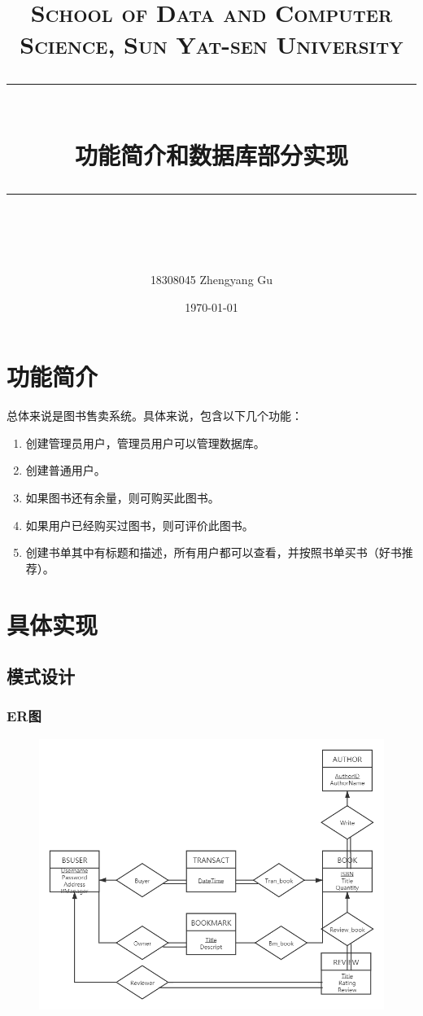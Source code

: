 \documentclass[UTF8, a4paper, 11pt]{article}
\title{	
\normalfont \normalsize
\textsc{School of Data and Computer Science, Sun Yat-sen University} \\ [25pt] %
\rule{\textwidth}{0.5pt} \\[0.4cm] %
\huge 功能简介和数据库部分实现\\ %
\rule{\textwidth}{2pt} \\[0.5cm] %
\author{18308045 Zhengyang Gu}
\date{\normalsize\today}
}
\begin{document}
\maketitle
\tableofcontents
\newpage
\section{功能简介}
总体来说是图书售卖系统。具体来说，包含以下几个功能：
\begin{enumerate}
    \item 创建管理员用户，管理员用户可以管理数据库。
    \item 创建普通用户。
    \item 如果图书还有余量，则可购买此图书。
    \item 如果用户已经购买过图书，则可评价此图书。
    \item 创建书单其中有标题和描述，所有用户都可以查看，并按照书单买书（好书推荐）。
\end{enumerate}

\section{具体实现}
\subsection{模式设计}
\subsubsection{ER图}
\begin{figure}[H]
    \centering
    \includegraphics[width = 0.8 \textwidth]{ER.png}
\end{figure}
\end{document}
